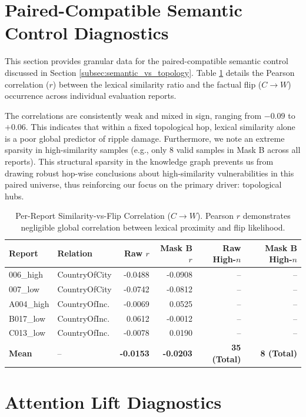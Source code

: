 \section{Paired-Compatible Semantic Control Diagnostics}
\label{app:semantic_diagnostics}

This section provides granular data for the paired-compatible semantic control discussed in Section \ref{subsec:semantic_vs_topology}. Table \ref{tab:semantic_corr} details the Pearson correlation ($r$) between the lexical similarity ratio and the factual flip ($C \rightarrow W$) occurrence across individual evaluation reports. 

The correlations are consistently weak and mixed in sign, ranging from $-0.09$ to $+0.06$. This indicates that within a fixed topological hop, lexical similarity alone is a poor global predictor of ripple damage. Furthermore, we note an extreme sparsity in high-similarity samples (e.g., only 8 valid samples in Mask B across all reports). This structural sparsity in the knowledge graph prevents us from drawing robust hop-wise conclusions about high-similarity vulnerabilities in this paired universe, thus reinforcing our focus on the primary driver: topological hubs.

\begin{table}[htbp]
\centering
\small
\begin{tabular}{llrrrr}
\toprule
\textbf{Report} & \textbf{Relation} & \textbf{Raw $r$} & \textbf{Mask B $r$} & \textbf{Raw High-$n$} & \textbf{Mask B High-$n$} \\
\midrule
006\_high & CountryOfCity & -0.0488 & -0.0908 & -- & -- \\
007\_low  & CountryOfCity & -0.0742 & -0.0812 & -- & -- \\
A004\_high& CountryOfInc. & -0.0069 &  0.0525 & -- & -- \\
B017\_low & CountryOfInc. &  0.0612 & -0.0012 & -- & -- \\
C013\_low & CountryOfInc. & -0.0078 &  0.0190 & -- & -- \\
\midrule
\textbf{Mean} & -- & \textbf{-0.0153} & \textbf{-0.0203} & \textbf{35 (Total)} & \textbf{8 (Total)} \\
\bottomrule
\end{tabular}
\caption{Per-Report Similarity-vs-Flip Correlation ($C \rightarrow W$). Pearson $r$ demonstrates negligible global correlation between lexical proximity and flip likelihood.}
\label{tab:semantic_corr}
\end{table} %
\section{Attention Lift Diagnostics}
\label{app:attention_diagnostics}

